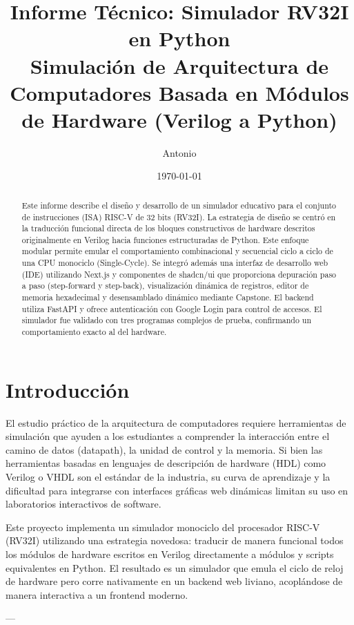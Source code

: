 \documentclass[12pt,letterpaper]{article}
\title{
    \textbf{Informe Técnico: Simulador RV32I en Python}\\
    \large{Simulación de Arquitectura de Computadores Basada en Módulos de Hardware (Verilog a Python)}
}
\author{Antonio}
\date{\today}
\begin{document}
\maketitle

\begin{abstract}
Este informe describe el diseño y desarrollo de un simulador educativo para el conjunto de instrucciones (ISA) RISC-V de 32 bits (RV32I). La estrategia de diseño se centró en la traducción funcional directa de los bloques constructivos de hardware descritos originalmente en Verilog hacia funciones estructuradas de Python. Este enfoque modular permite emular el comportamiento combinacional y secuencial ciclo a ciclo de una CPU monociclo (Single-Cycle). Se integró además una interfaz de desarrollo web (IDE) utilizando Next.js y componentes de shadcn/ui que proporciona depuración paso a paso (step-forward y step-back), visualización dinámica de registros, editor de memoria hexadecimal y desensamblado dinámico mediante Capstone. El backend utiliza FastAPI y ofrece autenticación con Google Login para control de accesos. El simulador fue validado con tres programas complejos de prueba, confirmando un comportamiento exacto al del hardware.
\end{abstract}

\newpage
\tableofcontents
\newpage

\section{Introducción}
El estudio práctico de la arquitectura de computadores requiere herramientas de simulación que ayuden a los estudiantes a comprender la interacción entre el camino de datos (datapath), la unidad de control y la memoria. Si bien las herramientas basadas en lenguajes de descripción de hardware (HDL) como Verilog o VHDL son el estándar de la industria, su curva de aprendizaje y la dificultad para integrarse con interfaces gráficas web dinámicas limitan su uso en laboratorios interactivos de software.

Este proyecto implementa un simulador monociclo del procesador RISC-V (RV32I) utilizando una estrategia novedosa: traducir de manera funcional todos los módulos de hardware escritos en Verilog directamente a módulos y scripts equivalentes en Python. El resultado es un simulador que emula el ciclo de reloj de hardware pero corre nativamente en un backend web liviano, acoplándose de manera interactiva a un frontend moderno.

---
\end{document}
